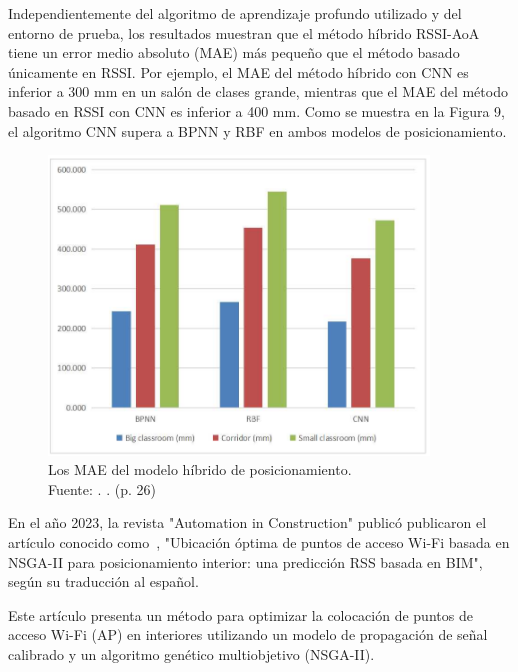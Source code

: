 Independientemente del algoritmo de aprendizaje profundo utilizado y del entorno de prueba, los resultados muestran que el método híbrido RSSI-AoA tiene un error medio absoluto (MAE) más pequeño que el método basado únicamente en RSSI. Por ejemplo, el MAE del método híbrido con CNN es inferior a 300 mm en un salón de clases grande, mientras que el MAE del método basado en RSSI con CNN es inferior a 400 mm. Como se muestra en la Figura 9, el algoritmo CNN supera a BPNN y RBF en ambos modelos de posicionamiento.

\begin{figure}[!ht]
	\begin{center}
		\includegraphics[width=0.90\textwidth]{2/figures/cai2023.png}
		\caption[Los MAE del modelo híbrido de posicionamiento]{Los MAE del modelo híbrido de posicionamiento.\\
			Fuente: \cite{pr_cai2023precisewifi}. . (p. 26)}
		\label{2:fig117}
	\end{center}
\end{figure}

En el año 2023, la revista "Automation in Construction" publicó \cite{pr_hosseini2023NSGAIIap} publicaron el artículo conocido como , "Ubicación óptima de puntos de acceso Wi-Fi basada en NSGA-II para posicionamiento interior: una predicción RSS basada en BIM", según su traducción al español.

Este artículo presenta un método para optimizar la colocación de puntos de acceso Wi-Fi (AP) en interiores utilizando un modelo de propagación de señal calibrado y un algoritmo genético multiobjetivo (NSGA-II).

